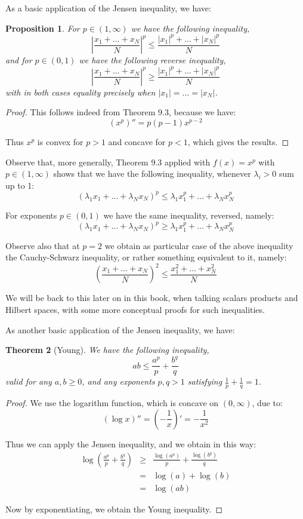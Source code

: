 \documentclass[12pt]{amsbook}
\newtheorem{theorem}{Theorem}[chapter]
\newtheorem{proposition}[theorem]{Proposition}
\begin{document}
As a basic application of the Jensen inequality, we have:


\begin{proposition}
For $p\in(1,\infty)$ we have the following inequality,
$$\left|\frac{x_1+\ldots+x_N}{N}\right|^p\leq\frac{|x_1|^p+\ldots+|x_N|^p}{N}$$
and for $p\in(0,1)$ we have the following reverse inequality,
$$\left|\frac{x_1+\ldots+x_N}{N}\right|^p\geq\frac{|x_1|^p+\ldots+|x_N|^p}{N}$$
with in both cases equality precisely when $|x_1|=\ldots=|x_N|$.
\end{proposition}

\begin{proof}
This follows indeed from Theorem 9.3, because we have:
$$(x^p)''=p(p-1)x^{p-2}$$

Thus $x^p$ is convex for $p>1$ and concave for $p<1$, which gives the results.
\end{proof}

Observe that, more generally, Theorem 9.3 applied with $f(x)=x^p$ with $p\in(1,\infty)$ shows that we have the following inequality, whenever $\lambda_i>0$ sum up to 1:
$$(\lambda_1x_1+\ldots+\lambda_Nx_N)^p\leq\lambda_1x_1^p+\ldots+\lambda_Nx_N^p$$

For exponents $p\in(0,1)$ we have the same inequality, reversed, namely:
$$(\lambda_1x_1+\ldots+\lambda_Nx_N)^p\geq\lambda_1x_1^p+\ldots+\lambda_Nx_N^p$$

Observe also that at $p=2$ we obtain as particular case of the above inequality the Cauchy-Schwarz inequality, or rather something equivalent to it, namely:
$$\left(\frac{x_1+\ldots+x_N}{N}\right)^2\leq\frac{x_1^2+\ldots+x_N^2}{N}$$

We will be back to this later on in this book, when talking scalars products and Hilbert spaces, with some more conceptual proofs for such inequalities.

\bigskip

As another basic application of the Jensen inequality, we have:

\begin{theorem}[Young]
We have the following inequality,
$$ab\leq \frac{a^p}{p}+\frac{b^q}{q}$$
valid for any $a,b\geq0$, and any exponents $p,q>1$ satisfying $\frac{1}{p}+\frac{1}{q}=1$. 
\end{theorem}

\begin{proof}
We use the logarithm function, which is concave on $(0,\infty)$, due to:
$$(\log x)''=\left(-\frac{1}{x}\right)'=-\frac{1}{x^2}$$

Thus we can apply the Jensen inequality, and we obtain in this way:
\begin{eqnarray*}
\log\left(\frac{a^p}{p}+\frac{b^q}{q}\right)
&\geq&\frac{\log(a^p)}{p}+\frac{\log(b^q)}{q}\\
&=&\log(a)+\log(b)\\
&=&\log(ab)
\end{eqnarray*}

Now by exponentiating, we obtain the Young inequality.
\end{proof}
\end{document}
